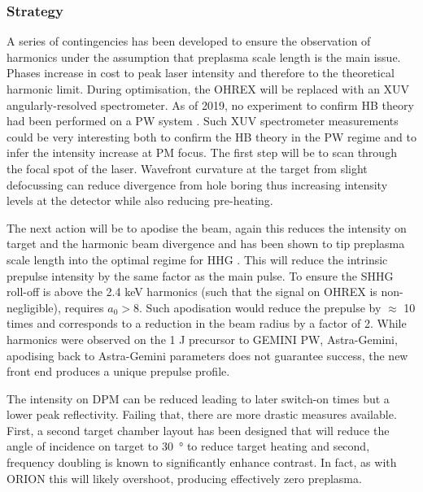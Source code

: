 \subsubsection{Strategy}
A series of contingencies has been developed to ensure the observation of harmonics under the assumption that preplasma scale length is the main issue. Phases increase in cost to peak laser intensity and therefore to the theoretical harmonic limit. During optimisation, the OHREX will be replaced with an XUV angularly-resolved spectrometer. As of 2019, no experiment to confirm HB theory had been performed on a PW system \cite{vincentiAchievingExtremeLight2019}. Such XUV spectrometer measurements could be very interesting both to confirm the HB theory in the PW regime and to infer the intensity increase at PM focus. The first step will be to scan through the focal spot of the laser. Wavefront curvature at the target from slight defocussing can reduce divergence from hole boring thus increasing intensity levels at the detector while also reducing pre-heating. 

The next action will be to apodise the beam, again this reduces the intensity on target and the harmonic beam divergence and has been shown to tip preplasma scale length into the optimal regime for HHG \cite{kahalyDirectObservationDensityGradient2013}. This will reduce the intrinsic prepulse intensity by the same factor as the main pulse. To ensure the SHHG roll-off is above the 2.4 keV harmonics (such that the signal on OHREX is non-negligible), requires $a_0 > 8$. Such apodisation would reduce the prepulse by $\approx$ 10 times and corresponds to a reduction in the beam radius by a factor of 2. While harmonics were observed on the 1 J precursor to GEMINI PW, Astra-Gemini, apodising back to Astra-Gemini parameters does not guarantee success, the new front end produces a unique prepulse profile.

The intensity on DPM can be reduced leading to later switch-on times but a lower peak reflectivity. Failing that, there are more drastic measures available. First, a second target chamber layout has been designed that will reduce the angle of incidence on target to \qty{30}{\degree} to reduce target heating and second, frequency doubling is known to significantly enhance contrast. In fact, as with ORION this will likely overshoot, producing effectively zero preplasma.

